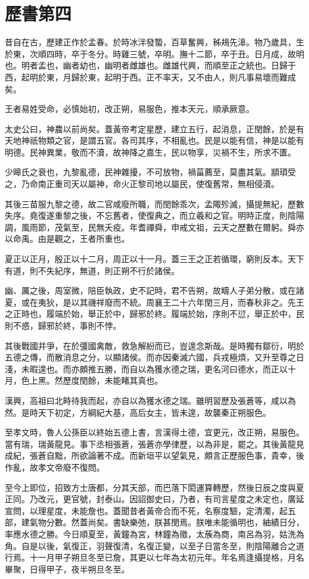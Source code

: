 \chapter{歷書第四}

昔自在古，歷建正作於孟春。於時冰泮發蟄，百草奮興，秭鳺先滜。物乃歲具，生於東，次順四時，卒于冬分。時雞三號，卒明。撫十二節，卒于丑。日月成，故明也。明者孟也，幽者幼也，幽明者雌雄也。雌雄代興，而順至正之統也。日歸于西，起明於東，月歸於東，起明于西。正不率天，又不由人，則凡事易壞而難成矣。

王者易姓受命，必慎始初，改正朔，易服色，推本天元，順承厥意。

太史公曰，神農以前尚矣。蓋黃帝考定星歷，建立五行，起消息，正閏餘，於是有天地神祇物類之官，是謂五官。各司其序，不相亂也。民是以能有信，神是以能有明德。民神異業，敬而不瀆，故神降之嘉生，民以物享，災禍不生，所求不匱。

少暤氏之衰也，九黎亂德，民神雜擾，不可放物，禍菑薦至，莫盡其氣。顓頊受之，乃命南正重司天以屬神，命火正黎司地以屬民，使復舊常，無相侵瀆。

其後三苗服九黎之德，故二官咸廢所職，而閏餘乖次，孟陬殄滅，攝提無紀，歷數失序。堯復遂重黎之後，不忘舊者，使復典之，而立羲和之官。明時正度，則陰陽調，風雨節，茂氣至，民無夭疫。年耆禪舜，申戒文祖，云天之歷數在爾躬。舜亦以命禹。由是觀之，王者所重也。

夏正以正月，殷正以十二月，周正以十一月。蓋三王之正若循環，窮則反本。天下有道，則不失紀序，無道，則正朔不行於諸侯。

幽、厲之後，周室微，陪臣執政，史不記時，君不告朔，故疇人子弟分散，或在諸夏，或在夷狄，是以其禨祥廢而不統。周襄王二十六年閏三月，而春秋非之。先王之正時也，履端於始，舉正於中，歸邪於終。履端於始，序則不愆，舉正於中，民則不惑，歸邪於終，事則不悖。

其後戰國并爭，在於彊國禽敵，救急解紛而已，豈遑念斯哉。是時獨有鄒衍，明於五德之傳，而散消息之分，以顯諸侯。而亦因秦滅六國，兵戎極煩，又升至尊之日淺，未暇遑也。而亦頗推五勝，而自以為獲水德之瑞，更名河曰德水，而正以十月，色上黑。然歷度閏餘，未能睹其真也。

漢興，高祖曰北畤待我而起，亦自以為獲水德之瑞。雖明習歷及張蒼等，咸以為然。是時天下初定，方綱紀大基，高后女主，皆未遑，故襲秦正朔服色。

至孝文時，魯人公孫臣以終始五德上書，言漢得土德，宜更元，改正朔，易服色。當有瑞，瑞黃龍見。事下丞相張蒼，張蒼亦學律歷，以為非是，罷之。其後黃龍見成紀，張蒼自黜，所欲論著不成。而新垣平以望氣見，頗言正歷服色事，貴幸，後作亂，故孝文帝廢不復問。

至今上即位，招致方士唐都，分其天部，而巴落下閎運算轉歷，然後日辰之度與夏正同。乃改元，更官號，封泰山。因詔御史曰，乃者，有司言星度之未定也，廣延宣問，以理星度，未能詹也。蓋聞昔者黃帝合而不死，名察度驗，定清濁，起五部，建氣物分數。然蓋尚矣。書缺樂弛，朕甚閔焉。朕唯未能循明也，紬績日分，率應水德之勝。今日順夏至，黃鐘為宮，林鐘為徵，太蔟為商，南呂為羽，姑洗為角。自是以後，氣復正，羽聲復清，名復正變，以至子日當冬至，則陰陽離合之道行焉。十一月甲子朔旦冬至已詹，其更以七年為太初元年。年名焉逢攝提格，月名畢聚，日得甲子，夜半朔旦冬至。

